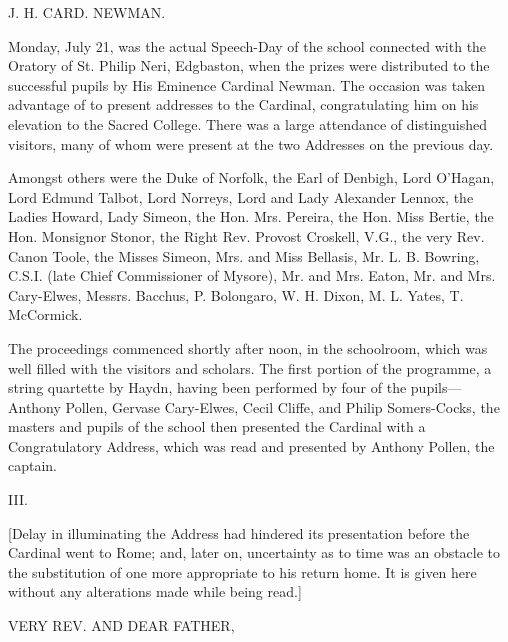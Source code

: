 J. H. CARD. NEWMAN.

Monday, July 21, was the actual Speech-Day of the school connected
with the Oratory of St. Philip Neri, Edgbaston, when the prizes were
distributed to the successful pupils by His Eminence Cardinal Newman.
The occasion was taken advantage of to present addresses to the
Cardinal, congratulating him on his elevation to the Sacred College.
There was a large attendance of distinguished visitors, many of whom
were present at the two Addresses on the previous day.

Amongst others were the Duke of Norfolk, the Earl of Denbigh, Lord
O'Hagan, Lord Edmund Talbot, Lord Norreys, Lord and Lady Alexander
Lennox, the Ladies Howard, Lady Simeon, the Hon. Mrs. Pereira, the
Hon. Miss Bertie, the Hon. Monsignor Stonor, the Right Rev. Provost
Croskell, V.G., the very Rev. Canon Toole, the Misses Simeon, Mrs. and
Miss Bellasis, Mr. L. B. Bowring, C.S.I. (late Chief Commissioner of
Mysore), Mr. and Mrs. Eaton, Mr. and Mrs. Cary-Elwes, Messrs. Bacchus,
P. Bolongaro, W. H. Dixon, M. L. Yates, T. McCormick.

The proceedings commenced shortly after noon, in the schoolroom,
which was well filled with the visitors and scholars. The first
portion of the programme, a string quartette by Haydn, having been
performed by four of the pupils—Anthony Pollen, Gervase Cary-Elwes,
Cecil Cliffe, and Philip Somers-Cocks, the masters and pupils of the
school then presented the Cardinal with a Congratulatory Address,
which was read and presented by Anthony Pollen, the captain.

III.


[Delay in illuminating the Address had hindered its presentation
before the Cardinal went to Rome; and, later on, uncertainty as to
time was an obstacle to the substitution of one more appropriate to
his return home. It is given here without any alterations made while
being read.]

VERY REV. AND
DEAR FATHER,

